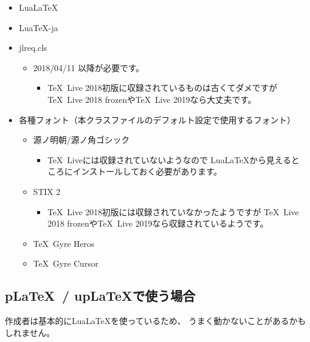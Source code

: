 \documentclass{FITpaper}
\begin{document}
\begin{itemize}
\item Lua\LaTeX
\item Lua\TeX -ja
\item jlreq.cls
  \begin{itemize}
  \item 2018/04/11 以降が必要です。
    \begin{itemize}
    \item \TeX~Live 2018初版に収録されているものは古くてダメですが
      \TeX~Live 2018 frozenや\TeX~Live 2019なら大丈夫です。
    \end{itemize}
  \end{itemize}
\item 各種フォント（本クラスファイルのデフォルト設定で使用するフォント）
  \begin{itemize}
  \item 源ノ明朝/源ノ角ゴシック
    \begin{itemize}
    \item \TeX~Liveには収録されていないようなので
      Lua\LaTeX から見えるところにインストールしておく必要があります。
    \end{itemize}
  \item STIX 2
    \begin{itemize}
    \item \TeX~Live 2018初版には収録されていなかったようですが
      \TeX~Live 2018 frozenや\TeX~Live 2019なら収録されているようです。
    \end{itemize}
  \item \TeX~Gyre Heros
  \item \TeX~Gyre Cursor
  \end{itemize}
\end{itemize}

\subsection{p\LaTeX~/ up\LaTeX で使う場合}

作成者は基本的にLua\LaTeX を使っているため、
うまく動かないことがあるかもしれません。
\end{document}
